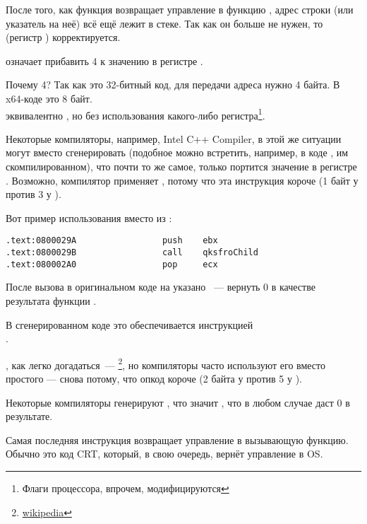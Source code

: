 После того, как функция \printf возвращает управление в функцию \main, адрес строки (или указатель на неё) всё ещё лежит в стеке.
Так как он больше не нужен, то  (регистр \ESP) корректируется.

 означает прибавить 4 к значению в регистре \ESP.

Почему 4? Так как это 32-битный код, для передачи адреса нужно 4 байта. В x64-коде это 8 байт.\\
 эквивалентно , но без использования какого-либо регистра\footnote{Флаги процессора, впрочем, модифицируются}.

\myindex{\oracle}

Некоторые компиляторы, например, Intel C++ Compiler, в этой же ситуации могут вместо 
\ADD сгенерировать  (подобное можно встретить, например, в коде \oracle{}, им скомпилированном),
что почти то же самое, только портится значение в регистре \ECX.
Возможно, компилятор применяет , потому что эта инструкция короче (1 байт у  против 3 у ).

Вот пример использования \POP вместо \ADD из \oracle{}:

\begin{lstlisting}[caption=\oracle 10.2 Linux (файл app.o),style=customasm]
.text:0800029A                 push    ebx
.text:0800029B                 call    qksfroChild
.text:080002A0                 pop     ecx
\end{lstlisting}

После вызова \printf в оригинальном коде на \CCpp указано ~--- вернуть 0 в качестве результата функции \main.

В сгенерированном коде это обеспечивается инструкцией \\
.


\XOR, как легко догадаться~--- \footnote{\href{http://go.yurichev.com/17118}{wikipedia}}, но компиляторы часто используют его вместо простого
 --- снова потому, что опкод короче (2 байта у \XOR против 5 у \MOV).

Некоторые компиляторы генерируют , что значит  \EAX {}\EAX, что в любом случае даст 0 в результате.

Самая последняя инструкция \RET возвращает управление в вызывающую функцию. Обычно это код \CCpp \ac{CRT}, который, в свою очередь, вернёт управление в \ac{OS}.

